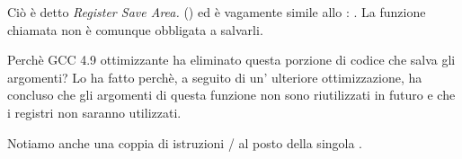 Ciò è detto \emph{Register Save Area.} (\ARMPCS) ed è vagamente simile allo : .
La funzione chiamata non è comunque obbligata a salvarli.

Perchè GCC 4.9 ottimizzante ha eliminato questa porzione di codice che salva gli argomenti?
Lo ha fatto perchè, a seguito di un' ulteriore ottimizzazione, ha concluso che gli argomenti di questa funzione non sono riutilizzati in futuro e
che i registri  non saranno utilizzati.


Notiamo anche una coppia di istruzioni / al posto della singola .
